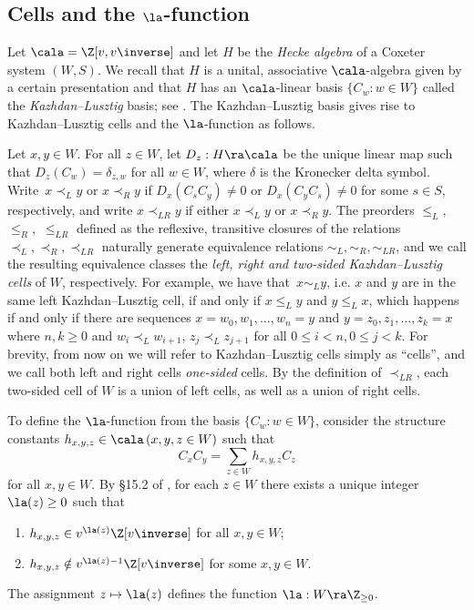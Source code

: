 \subsection{Cells and the \texorpdfstring{$\la$}{a}-function}
\label{sec:HeckeAlgebras}
Let $\cala=\Z[v,v\inverse]$ and let $H$ be the \emph{Hecke algebra} of a Coxeter system $(W,S)$.  We
recall that $H$ is a unital, associative $\cala$-algebra given by a certain presentation and that
$H$ has an $\cala$-linear basis $\{C_w:w\in W\}$ called the \emph{Kazhdan--Lusztig} basis; see
\cite[\S 2.2]{XuSubregular}. The Kazhdan--Lusztig basis gives rise to Kazhdan--Lusztig cells and the
$\la$-function as follows.


Let $x,y\in W$. For all $z\in W$, let $D_z: H\ra\cala$ be the unique linear map such that
$D_z(C_w)=\delta_{z,w}$ for all $w\in W$, where $\delta$ is the Kronecker delta symbol.  Write~$x\prec_L y$ 
or $x\prec_R y$ if $D_x(C_sC_y)\neq 0$ or $D_{x}(C_yC_s)\neq 0$ for some $s\in S$,
respectively, and write $x\prec_{LR}y$ if either $x\prec_L y$ or $x\prec_R y$.  The preorders
$\le_L,$ $\le_R,$ $\le_{LR}$ defined as the reflexive, transitive closures of the relations
$\prec_L,\prec_R, \prec_{LR}$ naturally generate equivalence relations $\sim_L, \sim_R, \sim_{LR}$,
and we call the resulting equivalence classes the  \emph{left, right and two-sided Kazhdan--Lusztig
cells} of $W$, respectively.  For example, we have that~$x\sim_L y$, i.e. $x$ and $y$ are in the same
left Kazhdan--Lusztig cell, if and only if $x\le_L y$ and $y\le_L x$, which happens if and only if
there are sequences $x=w_0,w_1,\dots, w_n=y$ and $y=z_0,z_1,\dots, z_k=x$ where $n,k\ge 0$ and
$w_i\prec_L w_{i+1}$, $z_j\prec_L z_{j+1}$ for all $0\le i<n, 0\le j<k$.  For brevity, from now on we
will refer to Kazhdan--Lusztig cells simply as ``cells'', and we call both left and right cells
\emph{one-sided} cells. By the definition of $\prec_{LR}$, each two-sided cell of $W$ is a union of
left cells, as well as a union of right cells. 

To define the $\la$-function from the basis $\{C_w:w\in W\}$, consider the structure constants
$h_{x,y,z}\in \cala \, (x,y,z\in W)$ such that 
\begin{equation}
    \label{eq:h} C_x C_y =\sum_{z\in W} h_{x,y,z} C_z 
\end{equation} for all $x,y\in W$. By \S 15.2 of \cite{LusztigHecke}, for each $z\in W$ there exists
    a unique integer $\la(z)\ge 0$ such that 
\begin{enumerate}
    \item[(a)] $h_{x,y,z}\in v^{\la(z)}\Z[v\inverse]$ for all $x,y\in W$;
    \item[(b)] $h_{x,y,z}\notin v^{\la(z)-1}\Z[v\inverse]$ for some $x,y\in W$. 
\end{enumerate} The assignment $z\mapsto \la(z)$ defines the function $\la: W\ra \Z_{\ge 0}$.

